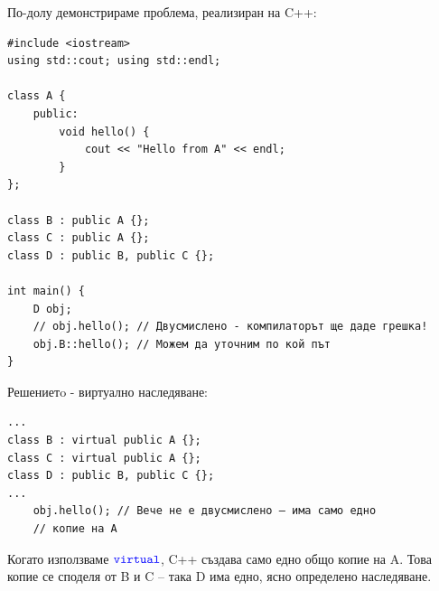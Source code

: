 \documentclass{article}
\begin{document}
По-долу демонстрираме проблема, реализиран на C++:
\begin{lstlisting}[style=cpp]
#include <iostream>
using std::cout; using std::endl;

class A {
    public:
        void hello() { 
            cout << "Hello from A" << endl; 
        }
};

class B : public A {};
class C : public A {};
class D : public B, public C {};

int main() {
    D obj;
    // obj.hello(); // Двусмислено - компилаторът ще даде грешка!
    obj.B::hello(); // Можем да уточним по кой път
}
\end{lstlisting}

Решениетo - виртуално наследяване:

\begin{lstlisting}[style=cpp]
...
class B : virtual public A {};
class C : virtual public A {};
class D : public B, public C {};
...
    obj.hello(); // Вече не е двусмислено – има само едно
    // копие на A
\end{lstlisting}

Когато използваме $\textcolor{blue}{\texttt{virtual}}$, C++ създава само едно общо копие на A. Това копие се споделя от B и C – така D има едно, ясно определено наследяване.

\section*{\centering \color{bordeaux}{Структури от данни и алгоритми}}

\subsection*{\color{bordeaux}{18. Структури от данни. Стек, опашка, списък, дърво. Основни операции върху тях. Реализация.}}
\end{document}
